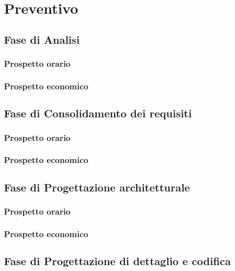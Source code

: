 \chapter{Preventivo}\label{Preventivo}

\section{Fase di Analisi}\label{5.1}

\subsection{Prospetto orario}\label{5.1.1}

\subsection{Prospetto economico}\label{5.1.2}

\section{Fase di Consolidamento dei requisiti}\label{5.2}

\subsection{Prospetto orario}\label{5.2.1}

\subsection{Prospetto economico}\label{5.2.2}

\section{Fase di Progettazione architetturale}\label{5.3}

\subsection{Prospetto orario}\label{5.3.1}

\subsection{Prospetto economico}\label{5.3.2}

\section{Fase di Progettazione di dettaglio e codifica}\label{5.4}


